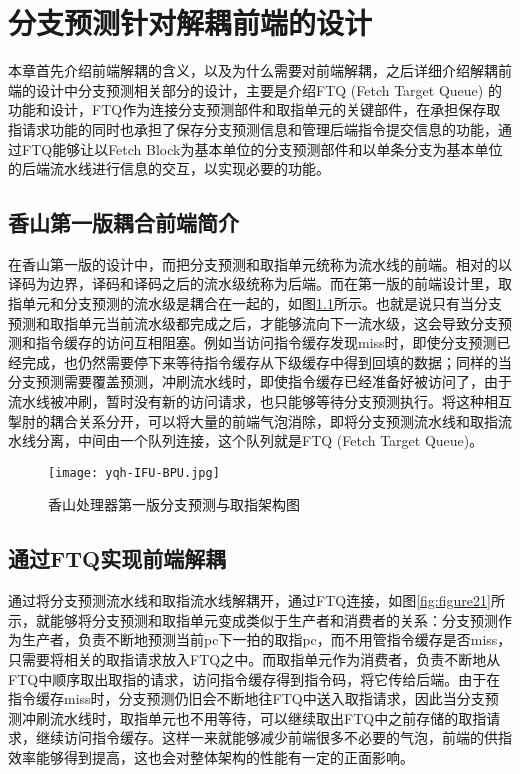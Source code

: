 \chapter{分支预测针对解耦前端的设计}

本章首先介绍前端解耦的含义，以及为什么需要对前端解耦，之后详细介绍解耦前端的设计中分支预测相关部分的设计，主要是介绍FTQ (Fetch Target Queue) 的功能和设计，FTQ作为连接分支预测部件和取指单元的关键部件，在承担保存取指请求功能的同时也承担了保存分支预测信息和管理后端指令提交信息的功能，通过FTQ能够让以Fetch Block为基本单位的分支预测部件和以单条分支为基本单位的后端流水线进行信息的交互，以实现必要的功能。

\section{香山第一版耦合前端简介}


在香山第一版的设计中，而把分支预测和取指单元统称为流水线的前端。相对的以译码为边界，译码和译码之后的流水级统称为后端。而在第一版的前端设计里，取指单元和分支预测的流水级是耦合在一起的，如图\ref{fig:figure41}所示。也就是说只有当分支预测和取指单元当前流水级都完成之后，才能够流向下一流水级，这会导致分支预测和指令缓存的访问互相阻塞。例如当访问指令缓存发现miss时，即使分支预测已经完成，也仍然需要停下来等待指令缓存从下级缓存中得到回填的数据；同样的当分支预测需要覆盖预测，冲刷流水线时，即使指令缓存已经准备好被访问了，由于流水线被冲刷，暂时没有新的访问请求，也只能够等待分支预测执行。将这种相互掣肘的耦合关系分开，可以将大量的前端气泡消除，即将分支预测流水线和取指流水线分离，中间由一个队列连接，这个队列就是FTQ (Fetch Target Queue)。

\begin{figure}[htb]
	\centering
	\setlength\tabcolsep{3pt}  %
	\vspace{5pt} %
	\texttt{[image: yqh-IFU-BPU.jpg]}
	\caption{香山处理器第一版分支预测与取指架构图}
    \label{fig:figure41}
\end{figure}

\section{通过FTQ实现前端解耦}

通过将分支预测流水线和取指流水线解耦开，通过FTQ连接，如图\ref{fig:figure21}所示，就能够将分支预测和取指单元变成类似于生产者和消费者的关系：分支预测作为生产者，负责不断地预测当前pc下一拍的取指pc，而不用管指令缓存是否miss，只需要将相关的取指请求放入FTQ之中。而取指单元作为消费者，负责不断地从FTQ中顺序取出取指的请求，访问指令缓存得到指令码，将它传给后端。由于在指令缓存miss时，分支预测仍旧会不断地往FTQ中送入取指请求，因此当分支预测冲刷流水线时，取指单元也不用等待，可以继续取出FTQ中之前存储的取指请求，继续访问指令缓存。这样一来就能够减少前端很多不必要的气泡，前端的供指效率能够得到提高，这也会对整体架构的性能有一定的正面影响。

